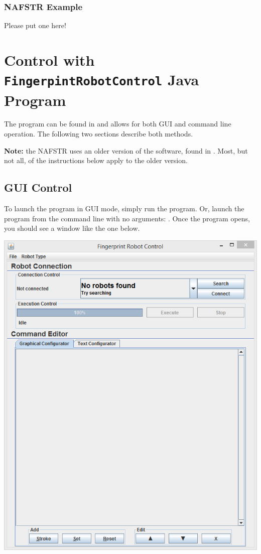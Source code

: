 \documentclass[letterpaper,10pt,english]{sphinxmanual}
\begin{document}
\subsubsection{NAFSTR Example}
\label{Use:nafstr-example}
Please put one here!


\section{Control with \texttt{FingerpintRobotControl} Java Program}
\label{Use:control-with-fingerpintrobotcontrol-java-program}
The program can be found in  and allows for both GUI and command line operation. The following two sections describe both methods.

\textbf{Note:} the NAFSTR uses an older version of the software, found in . Most, but not all, of the instructions below apply to the older version.


\subsection{GUI Control}
\label{Use:gui-control}
To launch the program in GUI mode, simply run the program. Or, launch the program from the command line with no arguments: . Once the program opens, you should see a window like the one below.

\includegraphics{JavaProgramEmpty.PNG}
\end{document}
